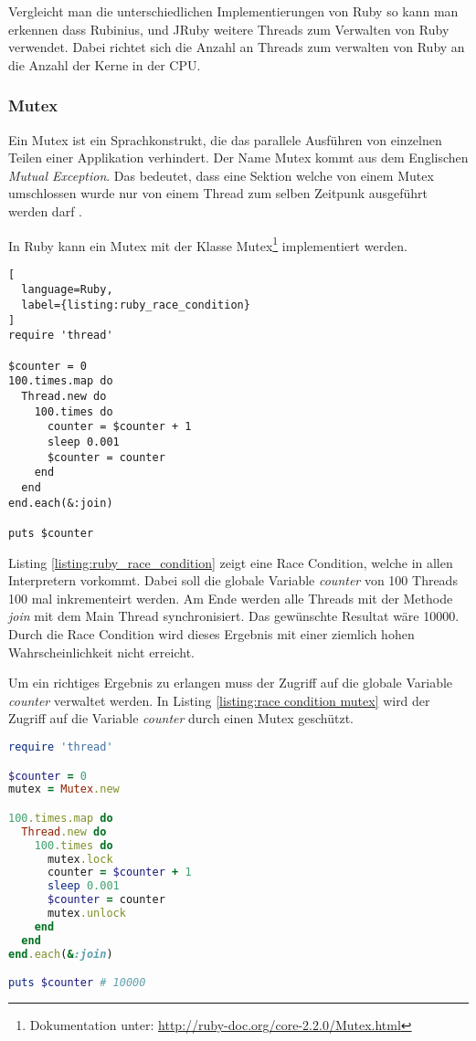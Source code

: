 Vergleicht man die unterschiedlichen Implementierungen von Ruby so kann man erkennen dass Rubinius, und JRuby weitere Threads zum Verwalten von Ruby verwendet. Dabei richtet sich die Anzahl an Threads zum verwalten von Ruby an die Anzahl der Kerne in der CPU.

\subsubsection{Mutex}
Ein Mutex ist ein Sprachkonstrukt, die das parallele Ausführen von einzelnen Teilen einer Applikation verhindert. Der Name Mutex kommt aus dem Englischen \emph{Mutual Exception}. Das bedeutet, dass eine Sektion welche von einem Mutex umschlossen wurde nur von einem Thread zum selben Zeitpunk ausgeführt werden darf \cite[p. 81]{Sto2013}. 

In Ruby kann ein Mutex mit der Klasse Mutex\footnote{Dokumentation unter:  \url{http://ruby-doc.org/core-2.2.0/Mutex.html}} implementiert werden.

\begin{lstlisting}[
  language=Ruby,
  label={listing:ruby_race_condition}
]
require 'thread'

$counter = 0
100.times.map do
  Thread.new do
    100.times do
      counter = $counter + 1
      sleep 0.001
      $counter = counter
    end
  end
end.each(&:join)

puts $counter
\end{lstlisting}

Listing \ref{listing:ruby_race_condition} zeigt eine Race Condition, welche in allen Interpretern vorkommt. Dabei soll die globale Variable \emph{counter} von 100 Threads 100 mal inkrementeirt werden. Am Ende werden alle Threads mit der Methode \emph{join} mit dem Main Thread synchronisiert. Das gewünschte Resultat wäre 10000. Durch die Race Condition wird dieses Ergebnis mit einer ziemlich hohen Wahrscheinlichkeit nicht erreicht.

Um ein richtiges Ergebnis zu erlangen muss der Zugriff auf die globale Variable \emph{counter} verwaltet werden. In Listing \ref{listing:race condition mutex} wird der Zugriff auf die Variable \emph{counter} durch einen Mutex geschützt. 

\begin{lstlisting}[language=Ruby,label={listing:race condition mutex}]
require 'thread'

$counter = 0
mutex = Mutex.new

100.times.map do
  Thread.new do
    100.times do
      mutex.lock
      counter = $counter + 1
      sleep 0.001
      $counter = counter
      mutex.unlock
    end
  end
end.each(&:join)

puts $counter # 10000
\end{lstlisting}

